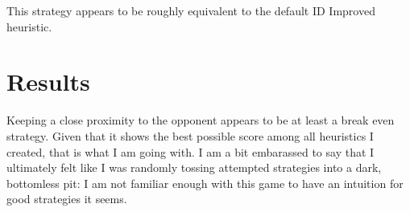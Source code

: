 \documentclass[10pt, a4paper]{article}
\begin{document}
This strategy appears to be roughly equivalent to the default ID Improved heuristic.

\section{Results}

Keeping a close proximity to the opponent appears to be at least a break even strategy.
Given that it shows the best possible score among all heuristics I created, that is what I am going with.
I am a bit embarassed to say that I ultimately felt like I was randomly tossing attempted strategies into
a dark, bottomless pit: I am not familiar enough with this game to have an intuition for good strategies it seems.
\end{document}
